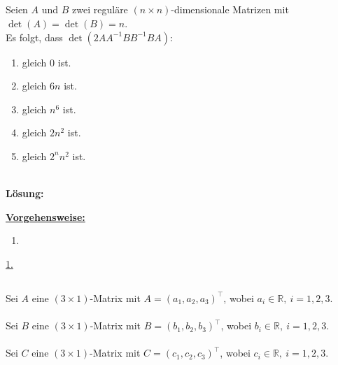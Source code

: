 \subsection*{}
Seien $A$ und $B$ zwei reguläre $(n \times n)$-dimensionale Matrizen mit $\det(A) = \det(B) = n$.\\
Es folgt, dass $\det(2AA^{-1} B B^{-1} B A)$:
\renewcommand{\labelenumi}{(\alph{enumi})}
\begin{enumerate}
	\item 
	gleich $0$ ist.
	\item
	gleich $6n$ ist.
	\item
	gleich $n^6$ ist.
	\item
	gleich $2 n^2$ ist.
	\item
	gleich $2^n n^2$ ist.
\end{enumerate}
\ \\
\textbf{Lösung:}
\begin{mdframed}
\underline{\textbf{Vorgehensweise:}}
\renewcommand{\labelenumi}{\theenumi.}
\begin{enumerate}
\item 
\end{enumerate}
\end{mdframed}

\underline{1. }\\

\newpage

\subsection*{}
Sei $ A $ eine $ (3 \times 1) $-Matrix mit $A = (a_1, a_2, a_3)^\top$, wobei $ a_i \in \mathbb{R}, \ i = 1,2,3$.\\
\\
Sei $ B $ eine $ (3 \times 1) $-Matrix mit $B = (b_1, b_2, b_3)^\top$, wobei $ b_i \in \mathbb{R}, \ i = 1,2,3$.\\
\\
Sei $ C $ eine $ (3 \times 1) $-Matrix mit $C = (c_1, c_2, c_3)^\top$, wobei $ c_i \in \mathbb{R}, \ i = 1,2,3$.\\


